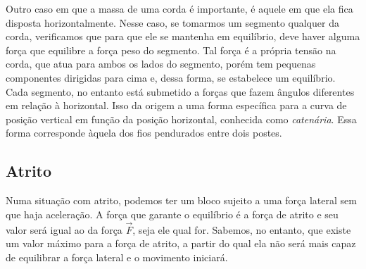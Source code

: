 Outro caso em que a massa de uma corda é importante, é aquele em que ela fica disposta horizontalmente. Nesse caso, se tomarmos um segmento qualquer da corda, verificamos que para que ele se mantenha em equilíbrio, deve haver alguma força que equilibre a força peso do segmento. Tal força é a própria tensão na corda, que atua para ambos os lados do segmento, porém tem pequenas componentes dirigidas para cima e, dessa forma, se estabelece um equilíbrio. Cada segmento, no entanto está submetido a forças que fazem ângulos diferentes em relação à horizontal. Isso da origem a uma forma específica para a curva de posição vertical em função da posição horizontal, conhecida como \emph{catenária}. Essa forma corresponde àquela dos fios pendurados entre dois postes. 

\subsection{Atrito}

\begin{marginfigure}
\centering
{}
\caption{Numa situação com atrito, podemos ter um bloco sujeito a uma força lateral sem que haja aceleração. A força que garante o equilíbrio é a força de atrito e seu valor será igual ao da força $\vec{F}$, seja ele qual for. Sabemos, no entanto, que existe um valor máximo para a força de atrito, a partir do qual ela não será mais capaz de equilibrar a força lateral e o movimento iniciará.}
\end{marginfigure}

